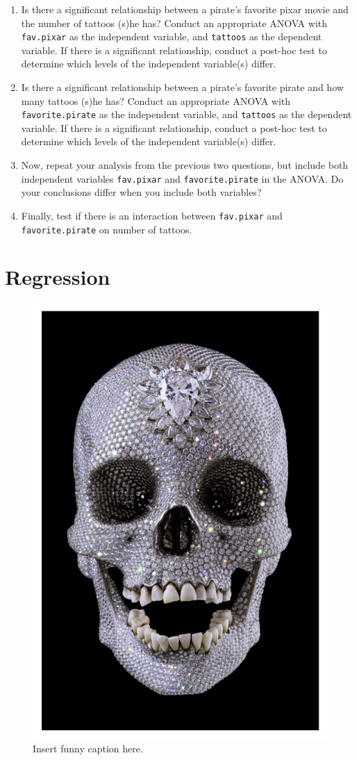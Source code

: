 \documentclass[]{book}
\theoremstyle{definition}
\theoremstyle{definition}
\theoremstyle{remark}
\begin{document}
\begin{enumerate}
\def\labelenumi{\arabic{enumi}.}
\item
  Is there a significant relationship between a pirate's favorite pixar
  movie and the number of tattoos (s)he has? Conduct an appropriate
  ANOVA with \texttt{fav.pixar} as the independent variable, and
  \texttt{tattoos} as the dependent variable. If there is a significant
  relationship, conduct a post-hoc test to determine which levels of the
  independent variable(s) differ.
\item
  Is there a significant relationship between a pirate's favorite pirate
  and how many tattoos (s)he has? Conduct an appropriate ANOVA with
  \texttt{favorite.pirate} as the independent variable, and
  \texttt{tattoos} as the dependent variable. If there is a significant
  relationship, conduct a post-hoc test to determine which levels of the
  independent variable(s) differ.
\item
  Now, repeat your analysis from the previous two questions, but include
  both independent variables \texttt{fav.pixar} and
  \texttt{favorite.pirate} in the ANOVA. Do your conclusions differ when
  you include both variables?
\item
  Finally, test if there is an interaction between \texttt{fav.pixar}
  and \texttt{favorite.pirate} on number of tattoos.
\end{enumerate}

\chapter{Regression}\label{regression}

\begin{figure}

{\centering \includegraphics[width=0.6\linewidth]{images/diamondskull} 

}

\caption{Insert funny caption here.}\label{fig:unnamed-chunk-399}
\end{figure}
\end{document}
